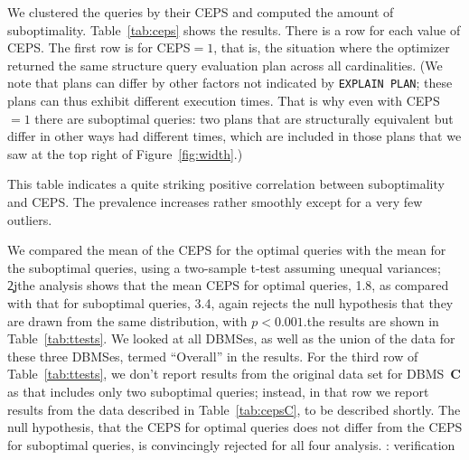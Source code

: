 We clustered the queries by their CEPS and computed the amount of
suboptimality. Table~\ref{tab:ceps} shows the results. There is a row for
each value of CEPS. The first row is for CEPS${}=1$, that is, the situation
where the
optimizer returned the same structure query evaluation plan across all
cardinalities. (We note that plans can differ by other factors not indicated
by {\tt EXPLAIN PLAN}; these plans can thus exhibit different execution
times. That is why even with CEPS${}=1$ there are suboptimal queries:
two plans that are structurally equivalent but differ in other ways had
different times, which are included in those plans that we saw at the top
right of Figure~\ref{fig:width}.) 

This table indicates a quite striking positive correlation
between suboptimality and CEPS. The prevalence increases rather
smoothly except for a very few outliers.

We compared the mean of the CEPS for the
optimal queries with the mean for the suboptimal queries, using a
two-sample \hbox{t-test} assuming unequal variances; \c2j{the analysis shows
  that the mean CEPS for optimal queries, 1.8, as compared with that for
  suboptimal queries, 3.4, again rejects
  the null hypothesis that they are drawn from the same distribution, with 
  $p<0.001$.}{the results are shown in
Table~\ref{tab:ttests}. We looked at all DBMSes, as well as the union of 
the data for these three DBMSes, termed
``Overall'' in the results. For the third row  of Table~\ref{tab:ttests}, 
we don't report results from the original data set for 
DBMS~{\bf C} as that includes only two suboptimal queries; instead,
in that row we report results from the data described
in Table~\ref{tab:cepsC}, to be described shortly.  The null hypothesis, that the CEPS for
optimal queries does not differ from the CEPS for suboptimal queries,
is convincingly rejected for all four analysis. {\todo: verification}}

